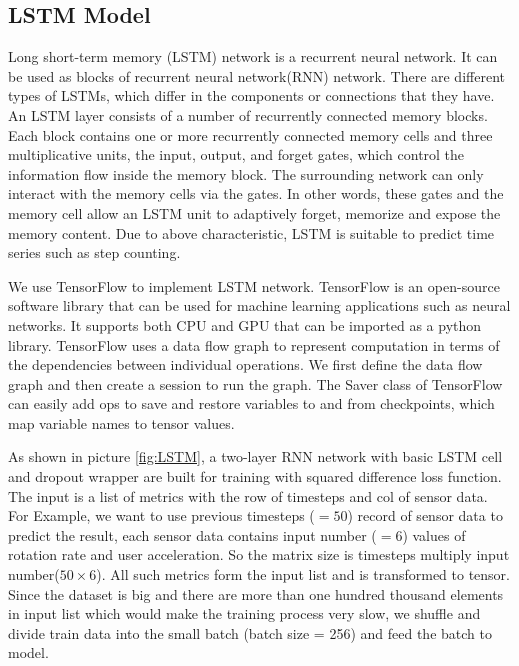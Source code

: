 \documentclass[11pt]{article}
\begin{document}
\subsection{LSTM Model}
Long short-term memory (LSTM) network is a recurrent neural network. It can be used as blocks of recurrent neural network(RNN) network. There are different types of LSTMs, which differ in the components or connections that they have. An LSTM layer consists of a number of recurrently connected memory blocks. Each block contains one or more recurrently connected memory cells and three multiplicative units, the input, output, and forget gates, which control the information flow inside the memory block. The surrounding network can only interact with the memory cells via the gates. In other words, these gates and the memory cell allow an LSTM unit to adaptively forget, memorize and expose the memory content. Due to above characteristic, LSTM is suitable to predict time series such as step counting.

We use TensorFlow to implement LSTM network. TensorFlow is an open-source software library that can be used for machine learning applications such as neural networks. It supports both CPU and GPU that can be imported as a python library. TensorFlow uses a data flow graph to represent computation in terms of the dependencies between individual operations. We first define the data flow graph and then create a session to run the graph. The Saver class of TensorFlow can easily add ops to save and restore variables to and from checkpoints, which map variable names to tensor values.

As shown in picture \ref{fig:LSTM}, a two-layer RNN network with basic LSTM cell and dropout wrapper are built for training with squared difference loss function. The input is a list of metrics with the row of timesteps and col of sensor data. For Example, we want to use previous timesteps ($=50$) record of sensor data to predict the result, each sensor data contains input number ($=6$) values of rotation rate and user acceleration. So the matrix size is timesteps multiply input number($50 \times 6$). All such metrics form the input list and is transformed to tensor. Since the dataset is big and there are more than one hundred thousand elements in input list which would make the training process very slow, we shuffle and divide train data into the small batch (batch size = 256) and feed the batch to model.
\end{document}
